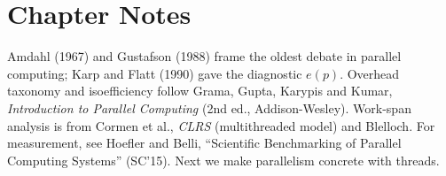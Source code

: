 \section*{Chapter Notes}
Amdahl (1967) and Gustafson (1988) frame the oldest debate in parallel computing; Karp and Flatt (1990) gave the diagnostic $e(p)$. Overhead taxonomy and isoefficiency follow Grama, Gupta, Karypis and Kumar, \textit{Introduction to Parallel Computing} (2nd ed., Addison-Wesley). Work-span analysis is from Cormen et al., \textit{CLRS} (multithreaded model) and Blelloch. For measurement, see Hoefler and Belli, ``Scientific Benchmarking of Parallel Computing Systems'' (SC'15). Next we make parallelism concrete with threads.
